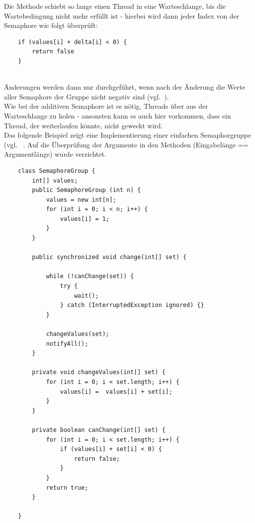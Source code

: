 \noindent
Die Methode schiebt so lange einen Thread in eine Warteschlange, bis die Wartebedingung nicht mehr erfüllt ist - hierbei wird dann jeder Index von der Semaphore wie folgt überprüft:


\begin{verbatim}
    if (values[i] + delta[i] < 0) {
        return false
    }
\end{verbatim}\\

Änderungen werden dann nur durchgeführt, wenn nach der Änderung die Werte aller Semaphore der Gruppe nicht negativ sind (vgl.~\cite[109]{Oec22}).\\

\noindent
Wie bei der additiven Semaphore ist es nötig, Threads über  aus der Warteschlange zu holen - ansonsten kann es auch hier vorkommen, dass ein Thread, der weiterlaufen könnte, nicht geweckt wird.\\

\noindent
Das folgende Beispiel zeigt eine Implementierung einer einfachen Semaphorgruppe (vgl.~\cite[110, Listing 3.5]{Oec22} .
Auf die Überprüfung der Argumente in den Methoden (Eingabelänge == Argumentlänge) wurde verzichtet.

\begin{verbatim}
    class SemaphoreGroup {
        int[] values;
        public SemaphoreGroup (int n) {
            values = new int[n];
            for (int i = 0; i < n; i++) {
                values[i] = 1;
            }
        }

        public synchronized void change(int[] set) {

            while (!canChange(set)) {
                try {
                    wait();
                } catch (InterruptedException ignored) {}
            }

            changeValues(set);
            notifyAll();
        }

        private void changeValues(int[] set) {
            for (int i = 0; i < set.length; i++) {
                values[i] =  values[i] + set[i];
            }
        }

        private boolean canChange(int[] set) {
            for (int i = 0; i < set.length; i++) {
                if (values[i] + set[i] < 0) {
                    return false;
                }
            }
            return true;
        }

    }
\end{verbatim}



